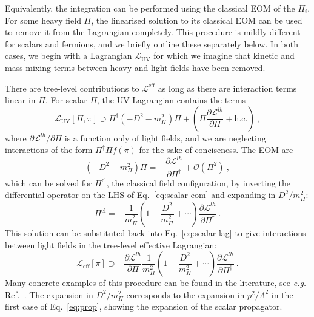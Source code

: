 Equivalently, the integration can be performed using the classical EOM of the
$\Pi_{i}$. For some heavy field $\Pi$, the linearised solution to its classical
EOM can be used to remove it from the Lagrangian completely. This procedure is
mildly different for scalars and fermions, and we briefly outline these
separately below. In both cases, we begin with a Lagrangian
$\mathscr{L}_{\text{UV}}$ for which we imagine that kinetic and mass mixing
terms between heavy and light fields have been removed.

There are tree-level contributions to $\mathscr{L}^{\text{eff}}$ as long as
there are interaction terms linear in $\Pi$. For scalar $\Pi$, the UV Lagrangian
contains the terms
\begin{equation}
  \label{eq:scalar-lag}
 \mathscr{L}_{\text{UV}}[\Pi, \pi] \supset \Pi^{\dagger} (- D^{2} - m_{\Pi}^{2}) \Pi + \left(\Pi \frac{\partial \mathscr{L}^{lh}}{\partial \Pi} + \text{h.c.} \right) \ ,
\end{equation}
where $\partial \mathscr{L}^{lh} / \partial \Pi$ is a function only of
light fields, and we are neglecting interactions of the form
$\Pi^{\dagger} \Pi f(\pi)$ for the sake of conciseness. The EOM are
\begin{equation}
  \label{eq:scalar-eom}
 (- D^{2} - m_{\Pi}^{2}) \Pi = - \frac{\partial \mathscr{L}^{lh}}{\partial \Pi^{\dagger}} + \mathcal{O}(\Pi^{2}) \ ,
\end{equation}
which can be solved for $\Pi^{\text{cl}}$, the classical field configuration, by
inverting the differential operator on the LHS of Eq.~\eqref{eq:scalar-eom} and
expanding in $D^{2} / m_{\Pi}^{2}$:
\begin{equation}
  \label{eq:scalar-repl}
  \Pi^{\text{cl}} = - \frac{1}{m_{\Pi}^{2}} \left( 1 - \frac{D^{2}}{m_{\Pi}^{2}}  + \cdots \right) \frac{\partial \mathscr{L}^{lh}}{\partial \Pi^{\dagger}} \ .
\end{equation}
This solution can be substituted back into Eq.~\eqref{eq:scalar-lag} to give
interactions between light fields in the tree-level effective Lagrangian:
\begin{equation}
  \label{eq:classical-efflag-scalar}
  \mathscr{L}_{\text{eff}}[\pi] \supset - \frac{\partial \mathscr{L}^{lh}}{\partial \Pi} \frac{1}{m_{\Pi}^{2}} \left( 1 - \frac{D^{2}}{m_{\Pi}^{2}} + \cdots \right) \frac{\partial \mathscr{L}^{lh}}{\partial \Pi^{\dagger}} \ .
\end{equation}
Many concrete examples of this procedure can be found in the literature, see
\textit{e.g.} Ref.~\cite{Henning:2014wua}. The expansion in $D^{2}/m_{\Pi}^{2}$
corresponds to the expansion in $p^{2} / \Lambda^{2}$ in the first case of
Eq.~\eqref{eq:prop}, showing the expansion of the scalar propagator.

